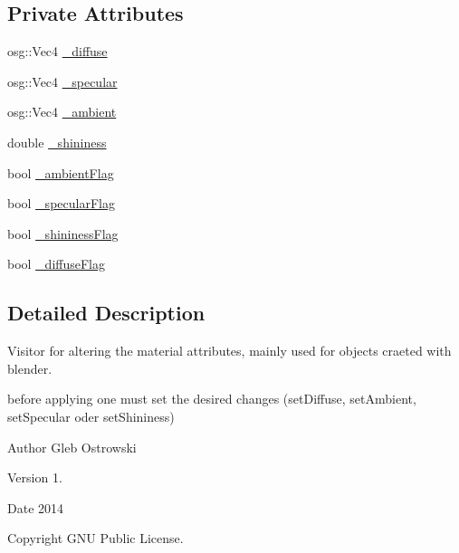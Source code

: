 \subsection*{Private Attributes}
\begin{DoxyCompactItemize}
\item 
osg\+::\+Vec4 \hyperlink{classbrtr_1_1_modify_material_visitor_a33e06870644e892df2ac9af4c5bbfbd8}{\+\_\+diffuse}
\item 
osg\+::\+Vec4 \hyperlink{classbrtr_1_1_modify_material_visitor_a4cbbdf6ecd85ec563839545fc328fbfe}{\+\_\+specular}
\item 
osg\+::\+Vec4 \hyperlink{classbrtr_1_1_modify_material_visitor_a1cffff6daf689c23a4e9680cd8f1441b}{\+\_\+ambient}
\item 
double \hyperlink{classbrtr_1_1_modify_material_visitor_a297f5208848d0bba92653bbd15908f68}{\+\_\+shininess}
\item 
bool \hyperlink{classbrtr_1_1_modify_material_visitor_a351e4cfeca41aa6f746956661930f994}{\+\_\+ambient\+Flag}
\item 
bool \hyperlink{classbrtr_1_1_modify_material_visitor_a154ad99cb3796be6d04347cdbfb66e10}{\+\_\+specular\+Flag}
\item 
bool \hyperlink{classbrtr_1_1_modify_material_visitor_a8b30ec1a8b93422fc168597a47425041}{\+\_\+shininess\+Flag}
\item 
bool \hyperlink{classbrtr_1_1_modify_material_visitor_a511c43fcd16d68855e6e63ca3ec1a84e}{\+\_\+diffuse\+Flag}
\end{DoxyCompactItemize}


\subsection{Detailed Description}
Visitor for altering the material attributes, mainly used for objects craeted with blender. 

before applying one must set the desired changes (set\+Diffuse, set\+Ambient, set\+Specular oder set\+Shininess) \begin{DoxyAuthor}{Author}
Gleb Ostrowski 
\end{DoxyAuthor}
\begin{DoxyVersion}{Version}
1. 
\end{DoxyVersion}
\begin{DoxyDate}{Date}
2014 
\end{DoxyDate}
\begin{DoxyCopyright}{Copyright}
G\+N\+U Public License. 
\end{DoxyCopyright}


